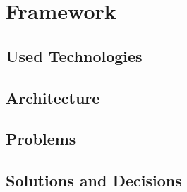 
\chapter{Framework}

\section{Used Technologies}
\section{Architecture}
\section{Problems}
\section{Solutions and Decisions}

